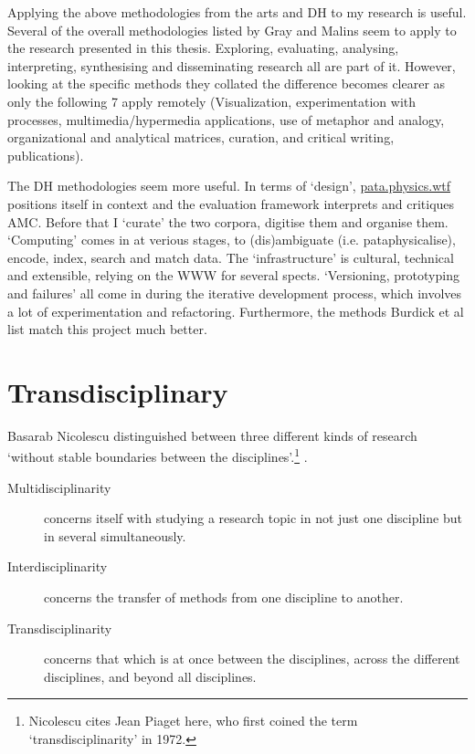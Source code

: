 \documentclass[11pt]{thesis} %
\begin{document}
\spirals

Applying the above methodologies from the arts and \ac{DH} to my research is useful. Several of the overall methodologies listed by Gray and Malins \citeyear{Gray2004} seem to apply to the research presented in this thesis. Exploring, evaluating, analysing, interpreting, synthesising and disseminating research all are part of it. However, looking at the specific methods they collated the difference becomes clearer as only the following 7 apply remotely (Visualization, experimentation with processes, multimedia/hypermedia applications, use of metaphor and analogy, organizational and analytical matrices, curation, and critical writing, publications).

The \ac{DH} methodologies seem more useful. In terms of `design', \url{pata.physics.wtf} positions itself in context and the evaluation framework interprets and critiques \ac{AMC}. Before that I `curate' the two corpora, digitise them and organise them. `Computing' comes in at verious stages, to (dis)ambiguate (i.e. pataphysicalise), encode, index, search and match data. The `infrastructure' is cultural, technical and extensible, relying on the \ac{WWW} for several spects. `Versioning, prototyping and failures' all come in during the iterative development process, which involves a lot of experimentation and refactoring. Furthermore, the methods Burdick et al \citeyear{Burdick2012} list match this project much better.


\section{Transdisciplinary}

Basarab Nicolescu distinguished between three different kinds of research `without stable boundaries between the disciplines'.\footnote{Nicolescu cites Jean Piaget here, who first coined the term `transdisciplinarity' in 1972.} \citeyear{Nicolescu2010}.

\begin{description}
  \item [Multidisciplinarity]	concerns itself with studying a research topic in not just one discipline but in several simultaneously.
  \item [Interdisciplinarity]	concerns the transfer of methods from one discipline to another.
  \item [Transdisciplinarity]	concerns that which is at once between the disciplines, across the different disciplines, and beyond all disciplines.
\end{description}
\end{document}
